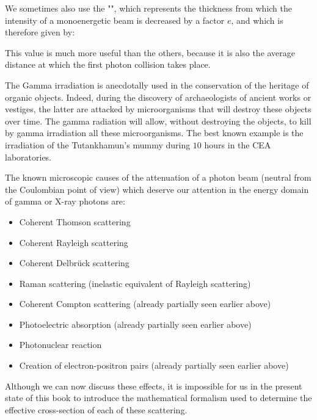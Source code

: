 	We sometimes also use the "", which represents the thickness from which the intensity of a monoenergetic beam is decreased by a factor $e$, and which is therefore given by:
	
	This value is much more useful than the others, because it is also the average distance at which the first photon collision takes place.
	\begin{tcolorbox}[title=Remark,colframe=black,arc=10pt]
	The Gamma irradiation is anecdotally used in the conservation of the heritage of organic objects. Indeed, during the discovery of archaeologists of ancient works or vestiges, the latter are attacked by microorganisms that will destroy these objects over time. The gamma radiation will allow, without destroying the objects, to kill by gamma irradiation all these microorganisms. The best known example is the irradiation of the Tutankhamun's mummy during $10$ hours in the CEA laboratories.
	\end{tcolorbox}
	The known microscopic causes of the attenuation of a photon beam (neutral from the Coulombian point of view) which deserve our attention in the energy domain of gamma or X-ray photons are:
	\begin{itemize}
		\item Coherent Thomson scattering

		\item Coherent Rayleigh scattering

		\item Coherent Delbrück scattering

		\item Raman scattering (inelastic equivalent of Rayleigh scattering)

		\item Coherent Compton scattering (already partially seen earlier above)

		\item Photoelectric absorption (already partially seen earlier above)

		\item Photonuclear reaction

		\item Creation of electron-positron pairs (already partially seen earlier above)
	\end{itemize}
	Although we can now discuss these effects, it is impossible for us in the present state of this book to introduce the mathematical formalism used to determine the effective cross-section of each of these scattering.
	

